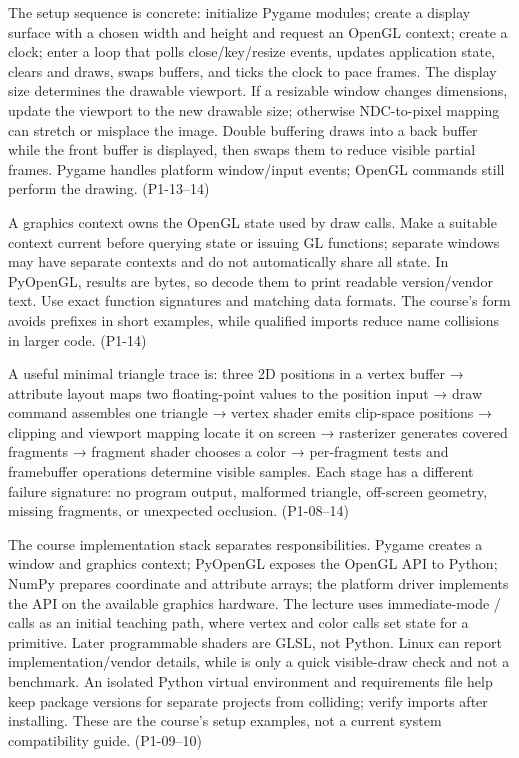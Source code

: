 The setup sequence is concrete: initialize Pygame modules; create a display surface with a chosen width and height and request an OpenGL context; create a clock; enter a loop that polls close/key/resize events, updates application state, clears and draws, swaps buffers, and ticks the clock to pace frames. The display size determines the drawable viewport. If a resizable window changes dimensions, update the viewport to the new drawable size; otherwise NDC-to-pixel mapping can stretch or misplace the image. Double buffering draws into a back buffer while the front buffer is displayed, then swaps them to reduce visible partial frames. Pygame handles platform window/input events; OpenGL commands still perform the drawing. (P1-13--14)

A graphics context owns the OpenGL state used by draw calls. Make a suitable context current before querying state or issuing GL functions; separate windows may have separate contexts and do not automatically share all state. In PyOpenGL,  results are bytes, so decode them to print readable version/vendor text. Use exact function signatures and matching data formats. The course's  form avoids prefixes in short examples, while qualified imports reduce name collisions in larger code. (P1-14)

A useful minimal triangle trace is: three 2D positions in a vertex buffer → attribute layout maps two floating-point values to the position input → draw command assembles one triangle → vertex shader emits clip-space positions → clipping and viewport mapping locate it on screen → rasterizer generates covered fragments → fragment shader chooses a color → per-fragment tests and framebuffer operations determine visible samples. Each stage has a different failure signature: no program output, malformed triangle, off-screen geometry, missing fragments, or unexpected occlusion. (P1-08--14)

The course implementation stack separates responsibilities. Pygame creates a window and graphics context; PyOpenGL exposes the OpenGL API to Python; NumPy prepares coordinate and attribute arrays; the platform driver implements the API on the available graphics hardware. The lecture uses immediate-mode / calls as an initial teaching path, where vertex and color calls set state for a primitive. Later programmable shaders are GLSL, not Python. Linux  can report implementation/vendor details, while  is only a quick visible-draw check and not a benchmark. An isolated Python virtual environment and requirements file help keep package versions for separate projects from colliding; verify imports after installing. These are the course's setup examples, not a current system compatibility guide. (P1-09--10)

